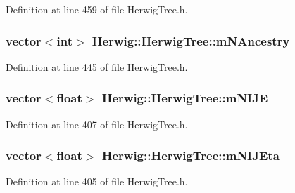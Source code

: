 Definition at line 459 of file Herwig\+Tree.\+h.

\subsubsection[{\texorpdfstring{m\+N\+Ancestry}{mNAncestry}}]{\setlength{\rightskip}{0pt plus 5cm}vector$<$int$>$ Herwig\+::\+Herwig\+Tree\+::m\+N\+Ancestry\hspace{0.3cm}{\ttfamily [protected]}}\hypertarget{class_herwig_1_1_herwig_tree_aee9127c2468fe19ec48667cd8f3de2a2}{}\label{class_herwig_1_1_herwig_tree_aee9127c2468fe19ec48667cd8f3de2a2}


Definition at line 445 of file Herwig\+Tree.\+h.

\subsubsection[{\texorpdfstring{m\+N\+I\+JE}{mNIJE}}]{\setlength{\rightskip}{0pt plus 5cm}vector$<$float$>$ Herwig\+::\+Herwig\+Tree\+::m\+N\+I\+JE\hspace{0.3cm}{\ttfamily [protected]}}\hypertarget{class_herwig_1_1_herwig_tree_a7b03a77b42e5d27533adcbeb6cc6e701}{}\label{class_herwig_1_1_herwig_tree_a7b03a77b42e5d27533adcbeb6cc6e701}


Definition at line 407 of file Herwig\+Tree.\+h.

\subsubsection[{\texorpdfstring{m\+N\+I\+J\+Eta}{mNIJEta}}]{\setlength{\rightskip}{0pt plus 5cm}vector$<$float$>$ Herwig\+::\+Herwig\+Tree\+::m\+N\+I\+J\+Eta\hspace{0.3cm}{\ttfamily [protected]}}\hypertarget{class_herwig_1_1_herwig_tree_aef150f8f0a6ace649bb0d794577c6705}{}\label{class_herwig_1_1_herwig_tree_aef150f8f0a6ace649bb0d794577c6705}


Definition at line 405 of file Herwig\+Tree.\+h.

